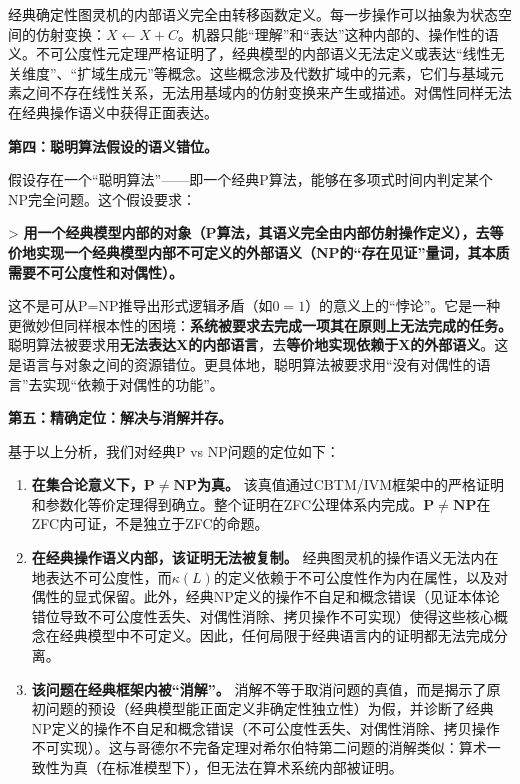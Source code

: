 \documentclass{ctexart}
\begin{document}
	经典确定性图灵机的内部语义完全由转移函数定义。每一步操作可以抽象为状态空间的仿射变换：$X \leftarrow X + C$。机器只能``理解''和``表达''这种内部的、操作性的语义。不可公度性元定理严格证明了，经典模型的内部语义无法定义或表达``线性无关维度''、``扩域生成元''等概念。这些概念涉及代数扩域中的元素，它们与基域元素之间不存在线性关系，无法用基域内的仿射变换来产生或描述。对偶性同样无法在经典操作语义中获得正面表达。
	
	\textbf{第四：聪明算法假设的语义错位。}
	
	假设存在一个``聪明算法''——即一个经典P算法，能够在多项式时间内判定某个NP完全问题。这个假设要求：
	
	> \textbf{用一个经典模型内部的对象（P算法，其语义完全由内部仿射操作定义），去等价地实现一个经典模型内部不可定义的外部语义（NP的``存在见证''量词，其本质需要不可公度性和对偶性）。}
	
	这不是可从P=NP推导出形式逻辑矛盾（如$0=1$）的意义上的``悖论''。它是一种更微妙但同样根本性的困境：\textbf{系统被要求去完成一项其在原则上无法完成的任务。} 聪明算法被要求用\textbf{无法表达X的内部语言}，去\textbf{等价地实现依赖于X的外部语义}。这是语言与对象之间的资源错位。更具体地，聪明算法被要求用``没有对偶性的语言''去实现``依赖于对偶性的功能''。
	
	\textbf{第五：精确定位：解决与消解并存。}
	
	基于以上分析，我们对经典P vs NP问题的定位如下：
	
	\begin{enumerate}
		\item \textbf{在集合论意义下，$\mathbf{P}\neq\mathbf{NP}$为真。} 该真值通过CBTM/IVM框架中的严格证明和参数化等价定理得到确立。整个证明在ZFC公理体系内完成。$\mathbf{P}\neq\mathbf{NP}$在ZFC内可证，不是独立于ZFC的命题。
		\item \textbf{在经典操作语义内部，该证明无法被复制。} 经典图灵机的操作语义无法内在地表达不可公度性，而$\kappa(L)$的定义依赖于不可公度性作为内在属性，以及对偶性的显式保留。此外，经典NP定义的操作不自足和概念错误（见证本体论错位导致不可公度性丢失、对偶性消除、拷贝操作不可实现）使得这些核心概念在经典模型中不可定义。因此，任何局限于经典语言内的证明都无法完成分离。
		\item \textbf{该问题在经典框架内被``消解''。} 消解不等于取消问题的真值，而是揭示了原初问题的预设（经典模型能正面定义非确定性独立性）为假，并诊断了经典NP定义的操作不自足和概念错误（不可公度性丢失、对偶性消除、拷贝操作不可实现）。这与哥德尔不完备定理对希尔伯特第二问题的消解类似：算术一致性为真（在标准模型下），但无法在算术系统内部被证明。
	\end{enumerate}
	
\end{document}
